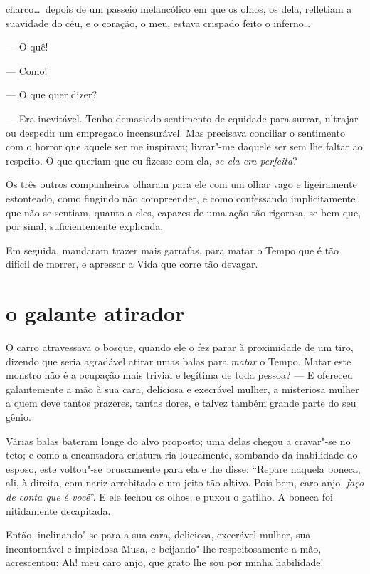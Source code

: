 \quebra

\noindent{}charco\ldots\  depois de um passeio melancólico em que os
olhos, os dela, refletiam a suavidade do céu, e o coração, o
meu, estava crispado feito o inferno\ldots\ 

--- O quê!

--- Como!

--- O que quer dizer?

--- Era inevitável. Tenho demasiado sentimento de equidade para
surrar, ultrajar ou despedir um empregado incensurável. Mas precisava conciliar o sentimento com o horror que aquele ser me 
inspirava; livrar"-me daquele ser sem lhe faltar ao respeito. 
O que queriam que eu fizesse com ela, \textit{se ela era
perfeita}?

Os três outros companheiros olharam para ele com um olhar vago e
ligeiramente estonteado, como fingindo não compreender, e como 
confessando implicitamente que não se sentiam, quanto a eles, capazes
de uma ação tão rigorosa, se bem que, por sinal, suficientemente
explicada.

Em seguida, mandaram trazer mais garrafas, para matar o Tempo que é tão difícil de morrer, e apressar a Vida que corre tão devagar.

\quebra\section[O galante atirador]{o galante atirador}

O carro atravessava o bosque, quando ele o fez parar à proximidade de um
tiro, dizendo que seria agradável atirar umas balas para \textit{matar} o
Tempo. Matar este monstro não é a ocupação mais trivial e legítima de
toda pessoa? --- E ofereceu galantemente a mão à sua cara, deliciosa e
execrável mulher, a misteriosa mulher a quem deve tantos prazeres,
tantas dores, e talvez também grande parte do seu gênio.

Várias balas bateram longe do alvo proposto; uma delas chegou a cravar"-se
no teto; e como a encantadora criatura ria loucamente, zombando da
inabilidade do esposo, este voltou"-se bruscamente para ela e lhe
disse: “Repare naquela boneca, ali, à direita, com
nariz arrebitado e um jeito tão altivo. Pois bem, caro anjo, \textit{faço de
conta que é você}''. E ele fechou os olhos, e puxou o
gatilho. A boneca foi nitidamente decapitada.

Então, inclinando"-se para a sua cara, deliciosa, execrável mulher, sua
incontornável e impiedosa Musa, e beijando"-lhe respeitosamente a mão,
acrescentou: Ah! meu caro anjo, que grato lhe sou por
minha habilidade!

